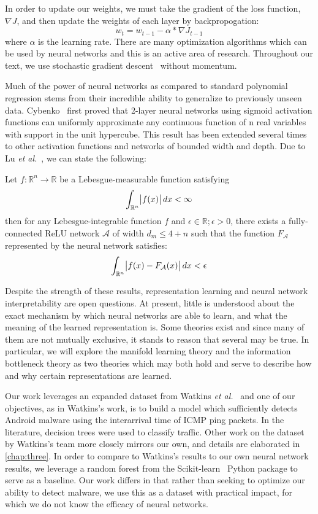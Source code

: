 In order to update our weights, we must take the gradient of the loss function, $\nabla J$, and then update the weights of each layer by backpropogation: 
$$w_t = w_{t-1} - \alpha * \nabla J_{t-1}$$
where $\alpha$ is the learning rate.
There are many optimization algorithms which can be used by neural networks and this is an active area of research.
Throughout our text, we use stochastic gradient descent~\cite{hastie01statisticallearning} without momentum.

Much of the power of neural networks as compared to standard polynomial regression stems from their incredible ability to generalize to previously unseen data.
Cybenko~\cite{cybenko1989approximation} first proved that 2-layer neural networks using sigmoid activation functions can uniformly approximate any continuous function of n real variables with support in the unit hypercube.
This result has been extended several times to other activation functions and networks of bounded width and depth. 
Due to Lu \textit{et al.}~\cite{lu2017expressive}, we can state the following:

\begin{theorem}
Let $f: \mathbb{R}^n \to \mathbb{R}$ be a Lebesgue-measurable function satisfying
$$\int_{\mathbb{R}^n} \abs{f(x)} dx < \infty$$
then for any Lebesgue-integrable function $f$ and $\epsilon \in \mathbb{R}; \epsilon > 0$, there exists a fully-connected ReLU network $\mathcal{A}$ of width $d_m \leq 4 + n$ such that the function $F_{\mathcal{A}}$ represented by the neural network satisfies:
$$\int_{\mathbb{R}^n} \abs{f(x) - F_{\mathcal{A}}(x)}dx < \epsilon$$
\end{theorem}

Despite the strength of these results, representation learning and neural network interpretability are open questions.
At present, little is understood about the exact mechanism by which neural networks are able to learn, and what the meaning of the learned representation is.
Some theories exist and since many of them are not mutually exclusive, it stands to reason that several may be true.
In particular, we will explore the manifold learning theory and the information bottleneck theory as two theories which may both hold and serve to describe how and why certain representations are learned.


Our work leverages an expanded dataset from Watkins \textit{et al.}~\cite{watkins2013using} and one of our objectives, as in Watkins's work, is to build a model which sufficiently detects Android malware using the interarrival time of ICMP ping packets.
In the literature, decision trees were used to classify traffic.
Other work on the dataset by Watkins's team more closely mirrors our own, and details are elaborated in \ref{chap:three}.
In order to compare to Watkins's results to our own neural network results, we leverage a random forest from the Scikit-learn~\cite{scikit-learn} Python package to serve as a baseline.
Our work differs in that rather than seeking to optimize our ability to detect malware, we use this as a dataset with practical impact, for which we do not know the efficacy of neural networks.

